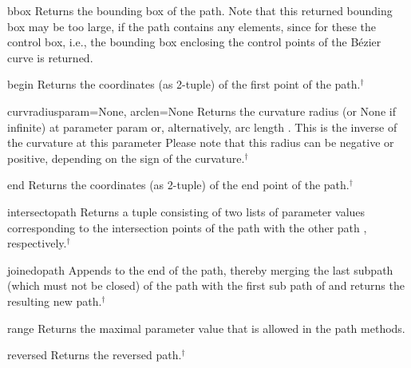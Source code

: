 \begin{methoddesc}{bbox}{}
  Returns the bounding box of the path. Note that this returned
  bounding box may be too large, if the path contains any
   elements, since for these the control box, i.e., the
  bounding box enclosing the control points of the B\'ezier curve is
  returned.
\end{methoddesc}

\begin{methoddesc}{begin}{}
  Returns the coordinates (as 2-tuple) of the first point of the path.$^\dagger$
\end{methoddesc}

\begin{methoddesc}{curvradius}{param=None, arclen=None}
  Returns the curvature radius (or None if infinite) at parameter
  param or, alternatively, arc length .  This is the
  inverse of the curvature at this parameter Please note that this
  radius can be negative or positive, depending on the sign of the
  curvature.$^\dagger$
\end{methoddesc}

\begin{methoddesc}{end}{}
  Returns the coordinates (as 2-tuple) of the end point of the path.$^\dagger$
\end{methoddesc}

\begin{methoddesc}{intersect}{opath}
  Returns a tuple consisting of two lists of parameter values
  corresponding to the intersection points of the path with the other
  path , respectively.$^\dagger$
\end{methoddesc}

\begin{methoddesc}{joined}{opath}
  Appends  to the end of the path, thereby merging the last
  subpath (which must not be closed) of the path with the first sub
  path of  and returns the resulting new path.$^\dagger$
\end{methoddesc}

\begin{methoddesc}{range}{}
  Returns the maximal parameter value  that is allowed in the
  path methods.
\end{methoddesc}

\begin{methoddesc}{reversed}{}
  Returns the reversed path.$^\dagger$
\end{methoddesc}

